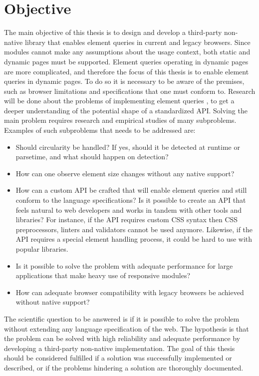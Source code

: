 \documentclass[a4paper,11pt]{kth-mag}
\begin{document}
    \section{Objective}
      The main objective of this thesis is to design and develop a \gls{third-party} non-\gls{native} library that enables element queries in current and legacy \glspl{browser}.
      Since modules cannot make any assumptions about the usage context, both static and dynamic pages must be supported.
      Element queries operating in dynamic pages are more complicated, and therefore the focus of this thesis is to enable element queries in dynamic pages.
      To do so it is necessary to be aware of the premises, such as \gls{browser} limitations and specifications that one must conform to.
      Research will be done about the problems of implementing element queries , to get a deeper understanding of the potential shape of a standardized \gls{API}.
      Solving the main problem requires research and empirical studies of many subproblems.
      Examples of such subproblems that needs to be addressed are:
      \begin{itemize}
        \item Should circularity be handled? If yes, should it be detected at runtime or parsetime, and what should happen on detection?
        \item How can one observe \gls{element} size changes without any \gls{native} support?
        \item
          How can a custom \gls{API} be crafted that will enable element queries and still conform to the language specifications? Is it possible to create an \gls{API} that feels natural to \gls{web} developers and works in tandem with other tools and libraries?
          For instance, if the \gls{API} requires custom \gls{CSS} syntax then \gls{CSS} preprocessors, linters and validators cannot be used anymore.
          Likewise, if the \gls{API} requires a special \gls{element} handling process, it could be hard to use with popular libraries. 
        \item Is it possible to solve the problem with adequate performance for large applications that make heavy use of \gls{responsive} modules?
        \item How can adequate \gls{browser} compatibility with legacy \glspl{browser} be achieved without \gls{native} support?
      \end{itemize}
      The scientific question to be answered is if it is possible to solve the problem without extending any language specification of the \gls{web}.
      The hypothesis is that the problem can be solved with high reliability and adequate performance by developing a \gls{third-party} non-\gls{native} implementation.
      The goal of this thesis should be considered fulfilled if a solution was successfully implemented or described, or if the problems hindering a solution are thoroughly documented.
\end{document}
